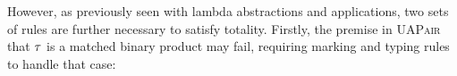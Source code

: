 \begin{mathpar}





\end{mathpar}

However, as previously seen with lambda abstractions and applications, two sets of rules are further
necessary to satisfy totality. Firstly, the premise in \textsc{UAPair} that $\TMV$ is a matched
binary product may fail, requiring marking and typing rules to handle that case:
%
\begin{mathpar}

\end{mathpar}

